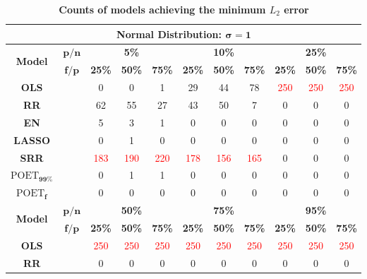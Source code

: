 \begin{table}[ht!]
\setlength{\tabcolsep}{0pt}
\renewcommand{\arraystretch}{0.8}
\Large
\caption{\textbf{Counts of models achieving the minimum $L_2$ error}}
\label{counts_mean_l2_error_SRR}
\footnotesize{
\begin{tabular*}{\textwidth}{@{\extracolsep{\fill}}ccccccccccc@{}}
\toprule
\multicolumn{11}{c}{\textbf{Normal Distribution: $\bm\sigma=\textbf{1}$}}\\
\midrule
\multirow{2}{*}{\textbf{Model}} & $\bm{p/n}$ & \multicolumn{3}{c}{\textbf{5\%}} & \multicolumn{3}{c}{\textbf{10\%}} & \multicolumn{3}{c}{\textbf{25\%}} \\
\cmidrule{3-5}
\cmidrule{6-8}
\cmidrule{9-11}
\multirow{2}{*}{} & $\bm{f/p}$ & \textbf{25\%} & \textbf{50\%} & \textbf{75\%} & \textbf{25\%} & \textbf{50\%} & \textbf{75\%} & \textbf{25\%} & \textbf{50\%} & \textbf{75\%} \\
\midrule
\textbf{OLS} &  & 0 & 0 & 1 & 29 & 44 & 78 & \textcolor{red}{250} & \textcolor{red}{250} & \textcolor{red}{250} \\
\textbf{RR} &  & 62 & 55 & 27 & 43 & 50 & 7 & 0 & 0 & 0 \\
\textbf{EN} &  & 5 & 3 & 1 & 0 & 0 & 0 & 0 & 0 & 0 \\
\textbf{LASSO} &  & 0 & 1 & 0 & 0 & 0 & 0 & 0 & 0 & 0 \\
\textbf{SRR} &  & \textcolor{red}{183} & \textcolor{red}{190} & \textcolor{red}{220} & \textcolor{red}{178} & \textcolor{red}{156} & \textcolor{red}{165} & 0 & 0 & 0 \\
\textbf{$\text{POET}_{\bm{99\%}}$} &  & 0 & 1 & 1 & 0 & 0 & 0 & 0 & 0 & 0 \\
\textbf{$\text{POET}_{\bm{f}}$} &  & 0 & 0 & 0 & 0 & 0 & 0 & 0 & 0 & 0 \\
\midrule
\multirow{2}{*}{\textbf{Model}} & $\bm{p/n}$ & \multicolumn{3}{c}{\textbf{50\%}} & \multicolumn{3}{c}{\textbf{75\%}} & \multicolumn{3}{c}{\textbf{95\%}} \\
\cmidrule{3-5}
\cmidrule{6-8}
\cmidrule{9-11}
\multirow{2}{*}{} & $\bm{f/p}$ & \textbf{25\%} & \textbf{50\%} & \textbf{75\%} & \textbf{25\%} & \textbf{50\%} & \textbf{75\%} & \textbf{25\%} & \textbf{50\%} & \textbf{75\%} \\
\midrule
\textbf{OLS} &  & \textcolor{red}{250} & \textcolor{red}{250} & \textcolor{red}{250} & \textcolor{red}{250} & \textcolor{red}{250} & \textcolor{red}{250} & \textcolor{red}{250} & \textcolor{red}{250} & \textcolor{red}{250} \\
\textbf{RR} &  & 0 & 0 & 0 & 0 & 0 & 0 & 0 & 0 & 0 \\

\end{tabular*}}
\end{table}
